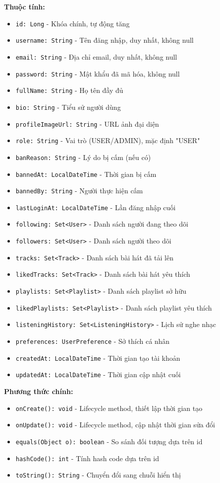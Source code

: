 \textbf{Thuộc tính:}
\begin{itemize}
    \item \texttt{id: Long} - Khóa chính, tự động tăng
    \item \texttt{username: String} - Tên đăng nhập, duy nhất, không null
    \item \texttt{email: String} - Địa chỉ email, duy nhất, không null
    \item \texttt{password: String} - Mật khẩu đã mã hóa, không null
    \item \texttt{fullName: String} - Họ tên đầy đủ
    \item \texttt{bio: String} - Tiểu sử người dùng
    \item \texttt{profileImageUrl: String} - URL ảnh đại diện
    \item \texttt{role: String} - Vai trò (USER/ADMIN), mặc định "USER"
    \item \texttt{banReason: String} - Lý do bị cấm (nếu có)
    \item \texttt{bannedAt: LocalDateTime} - Thời gian bị cấm
    \item \texttt{bannedBy: String} - Người thực hiện cấm
    \item \texttt{lastLoginAt: LocalDateTime} - Lần đăng nhập cuối
    \item \texttt{following: Set<User>} - Danh sách người đang theo dõi
    \item \texttt{followers: Set<User>} - Danh sách người theo dõi
    \item \texttt{tracks: Set<Track>} - Danh sách bài hát đã tải lên
    \item \texttt{likedTracks: Set<Track>} - Danh sách bài hát yêu thích
    \item \texttt{playlists: Set<Playlist>} - Danh sách playlist sở hữu
    \item \texttt{likedPlaylists: Set<Playlist>} - Danh sách playlist yêu thích
    \item \texttt{listeningHistory: Set<ListeningHistory>} - Lịch sử nghe nhạc
    \item \texttt{preferences: UserPreference} - Sở thích cá nhân
    \item \texttt{createdAt: LocalDateTime} - Thời gian tạo tài khoản
    \item \texttt{updatedAt: LocalDateTime} - Thời gian cập nhật cuối
\end{itemize}

\textbf{Phương thức chính:}
\begin{itemize}
    \item \texttt{onCreate(): void} - Lifecycle method, thiết lập thời gian tạo
    \item \texttt{onUpdate(): void} - Lifecycle method, cập nhật thời gian sửa đổi
    \item \texttt{equals(Object o): boolean} - So sánh đối tượng dựa trên id
    \item \texttt{hashCode(): int} - Tính hash code dựa trên id
    \item \texttt{toString(): String} - Chuyển đổi sang chuỗi hiển thị
\end{itemize}

